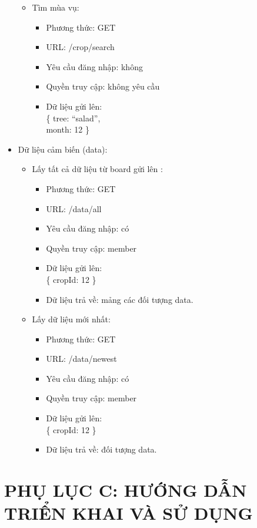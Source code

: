 \documentclass[a4paper,12pt,oneside]{article}
\begin{document}
\begin{itemize}
\begin{itemize}
\item Tìm mùa vụ:
	\begin{itemize}
	\item Phương thức: GET
	\item URL: /crop/search
	\item Yêu cầu đăng nhập: không
	\item Quyền truy cập: không yêu cầu
	\item Dữ liệu gửi lên:\\ 
		\{
			tree: “salad”,\\
			month: 12
		\}
	\end{itemize}
\end{itemize}
\item Dữ liệu cảm biến (data):

\begin{itemize}
\item Lấy tất cả dữ liệu từ board gửi lên :
	\begin{itemize}
	\item Phương thức: GET
	\item URL: /data/all
	\item Yêu cầu đăng nhập: có
	\item Quyền truy cập: member
	\item Dữ liệu gửi lên:\\ 
		\{
			cropId: 12
		\}
	\item Dữ liệu trả về: mảng các đối tượng data.
	\end{itemize}
	
\item Lấy dữ liệu mới nhất:
	\begin{itemize}
	\item Phương thức: GET
	\item URL: /data/newest
	\item Yêu cầu đăng nhập: có
	\item Quyền truy cập: member
	\item Dữ liệu gửi lên:\\ 
		\{
			cropId: 12
		\}
	\item Dữ liệu trả về: đối tượng data.
	\end{itemize}
\end{itemize}

\end{itemize}

\section{PHỤ LỤC C: HƯỚNG DẪN TRIỂN KHAI VÀ SỬ DỤNG}
\end{document}
